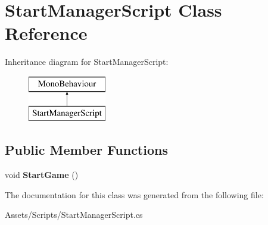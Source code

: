 \hypertarget{class_start_manager_script}{}\section{Start\+Manager\+Script Class Reference}
\label{class_start_manager_script}
Inheritance diagram for Start\+Manager\+Script\+:\begin{figure}[H]
\begin{center}
\leavevmode
\includegraphics[height=2.000000cm]{class_start_manager_script}
\end{center}
\end{figure}
\subsection*{Public Member Functions}
\begin{DoxyCompactItemize}
\item 
\hypertarget{class_start_manager_script_a7aeb924bcf7e16bc80e466610a5aa8de}{}void {\bfseries Start\+Game} ()\label{class_start_manager_script_a7aeb924bcf7e16bc80e466610a5aa8de}

\end{DoxyCompactItemize}


The documentation for this class was generated from the following file\+:\begin{DoxyCompactItemize}
\item 
Assets/\+Scripts/Start\+Manager\+Script.\+cs\end{DoxyCompactItemize}
